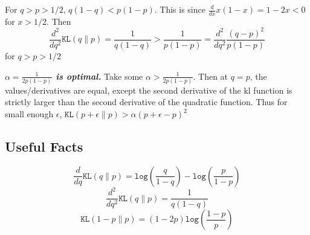 \documentclass{article}
\newcommand{\kl}[2] { \texttt{KL}(#1 \| #2) }
\newcommand{\logfrac}[2] { \texttt{log}\left(\frac{#1}{#2}\right)  }
\newcommand{\dq} { \frac{d}{dq}  }
\newcommand{\dnq}[1] { \frac{d^{#1}}{dq^{#1}} }
\begin{document}
For $q > p > 1/2$, $q(1-q) < p(1-p)$.  This is since $\frac{d}{dx} x(1-x) = 1-2x < 0$ for $x > 1/2$.  
Then 
$$\dnq{2} \kl{q}{p} = \frac{1}{q(1-q)} > \frac{1}{p(1-p)} = \dnq{2} \frac{(q-p)^2}{p(1-p)}$$ 
for $q > p > 1/2$

\textbf{\textit{$\alpha = \frac{1}{2p(1-p)}$ is optimal.}}
Take some $\alpha > \frac{1}{2p(1-p)}$.  Then at $q=p$, the values/derivatives are equal, except the second derivative of the kl function is strictly larger than the second derivative of the quadratic function.  Thus for small enough $\epsilon$, $\kl{p+\epsilon}{p} > \alpha(p+\epsilon-p)^2$

\subsection{Useful Facts}
$$\dq \kl{q}{p} = \logfrac{q}{1-q} - \logfrac{p}{1-p}$$
$$\dnq{2} \kl{q}{p} = \frac{1}{q(1-q)}$$
$$\kl{1-p}{p} = (1-2p) \logfrac{1-p}{p}$$
\end{document}
